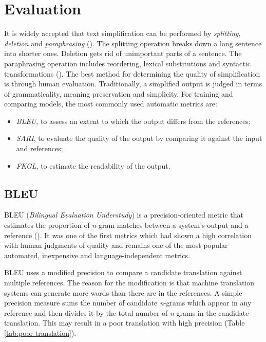 
\chapter{Evaluation}
\label{chap:evaluation}

It is widely accepted that text simplification can be performed by \emph{splitting}, \emph{deletion} and \emph{paraphrasing} (\cite{feng}). The splitting operation breaks down a long
sentence into shorter ones. Deletion gets rid of unimportant parts of a sentence. The paraphrasing operation includes reordering, lexical substitutions and syntactic transformations (\cite{xu-etal-2016-optimizing}). The best method for determining the quality of simplification is through human evaluation. Traditionally, a simplified output is judged in terms of grammaticality, meaning preservation and simplicity. For training and comparing models, the most commonly used automatic metrics are:

\begin{itemize}
    \item \emph{BLEU}, to assess an extent to which the output differs from the references;
    \item \emph{SARI}, to evaluate the quality of the output by comparing it against the input and references;
    \item \emph{FKGL}, to estimate the readability of the output.
\end{itemize}

\section{BLEU}
\label{sec:bleu}

BLEU (\emph{Bilingual Evaluation Understudy}) is a precision-oriented metric that estimates the proportion of \textit{n}-gram matches between a system’s output and a reference (\cite{papineni-etal-2002-bleu}). It was one of the first metrics which had shown a high correlation with human judgments of quality and remains one of the most popular automated, inexpensive and language-independent metrics.

BLEU uses a modified precision to compare a candidate translation against multiple references. The reason for the modification is that machine translation systems can generate more words than there are in the references. A simple precision measure sums the number of candidate \textit{n}-grams which appear in any reference and then divides it by the total number of \textit{n}-grams in the candidate translation. This may result in a poor translation with high precision (Table \ref{tab:poor-translation}).


